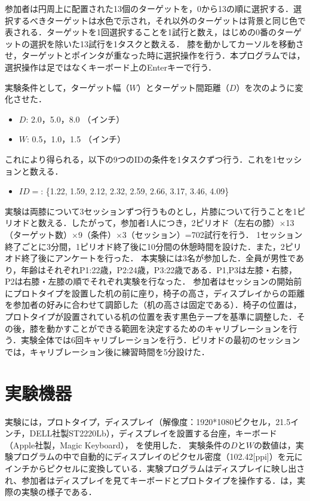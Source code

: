 参加者は円周上に配置された13個のターゲットを，0から13の順に選択する．選択するべきターゲットは水色で示され，それ以外のターゲットは背景と同じ色で表される．ターゲットを1回選択することを1試行と数え，はじめの0番のターゲットの選択を除いた13試行を1タスクと数える．
膝を動かしてカーソルを移動させ，ターゲットとポインタが重なった時に選択操作を行う．本プログラムでは，選択操作は足ではなくキーボード上のEnterキーで行う．

実験条件として，ターゲット幅（$W$）とターゲット間距離（$D$）を次のように変化させた．

\begin{itemize}
	\item $D$: 2.0，5.0，8.0 （インチ）
	\item $W$: 0.5，1.0，1.5 （インチ）
\end{itemize}
これにより得られる，以下の9つのIDの条件を1タスクずつ行う．これを1セッションと数える．
\begin{itemize}
	\item $ID = $: \{1.22, 1.59, 2.12, 2.32, 2.59, 2.66, 3.17,  3.46, 4.09\}
\end{itemize}
実験は両膝について3セッションずつ行うものとし，片膝について行うことを1ピリオドと数える．したがって，参加者1人につき，2ピリオド（左右の膝）$\times$13（ターゲット数）$\times$9（条件）$\times$3（セッション）=702試行を行う．
1セッション終了ごとに3分間，1ピリオド終了後に10分間の休憩時間を設けた．また，2ピリオド終了後にアンケートを行った．
本実験には3名が参加した．全員が男性であり，年齢はそれぞれP1:22歳，P2:24歳，P3:22歳である．P1,P3は左膝・右膝，P2は右膝・左膝の順でそれぞれ実験を行なった．
参加者はセッションの開始前にプロトタイプを設置した机の前に座り，椅子の高さ，ディスプレイからの距離を参加者の好みに合わせて調節した（机の高さは固定である）．椅子の位置は，プロトタイプが設置されている机の位置を表す黒色テープを基準に調整した．その後，膝を動かすことができる範囲を決定するためのキャリブレーションを行う．実験全体では6回キャリブレーションを行う．ピリオドの最初のセッションでは，キャリブレーション後に練習時間を5分設けた．
\section{実験機器}
実験には，プロトタイプ，ディスプレイ（解像度：1920*1080ピクセル，21.5インチ，DELL社製ST2220Lb），ディスプレイを設置する台座，キーボード（Apple社製，Magic Keyboard），
を使用した．
実験条件の$D$と$W$の数値は，実験プログラムの中で自動的にディスプレイのピクセル密度（102.42[ppi]）を元にインチからピクセルに変換している．実験プログラムはディスプレイに映し出され、参加者はディスプレイを見てキーボードとプロトタイプを操作する．は，実際の実験の様子である．

